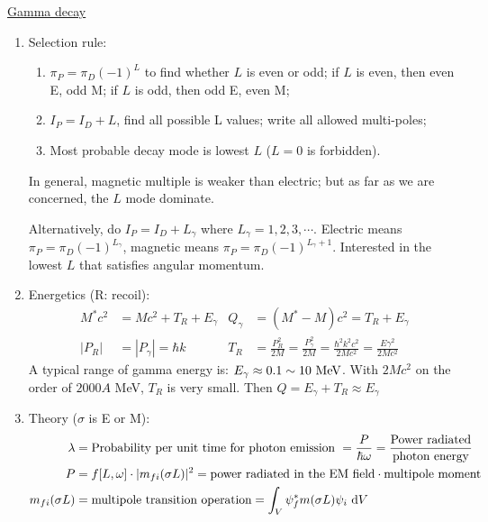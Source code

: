 \documentclass{school-22.101-notes}
\begin{document}
\clearpage
\uline{Gamma decay}
\begin{enumerate}
\item Selection rule:
    \begin{enumerate}
    \item  $\pi_P = \pi_D (-1)^L$ to find whether $L$ is even or odd; if $L$ is even, then even E, odd M; if $L$ is odd, then odd E, even M;
    \item $I_P = I_D + L$, find all possible L values; write all allowed multi-poles;
    \item Most probable decay mode is lowest $L$ ($L=0$ is forbidden). 
    \end{enumerate}
    In general, magnetic multiple is weaker than electric; but as far as we are concerned, the $L$ mode dominate. 

Alternatively, do $I_P = I_D + L_{\gamma}$ where $L_{\gamma} = 1,2,3, \cdots$.  Electric means $\pi_P = \pi_D (-1)^{L_{\gamma}}$, magnetic means $\pi_P = \pi_D (-1)^{L_{\gamma} + 1}$. Interested in the lowest $L$ that satisfies angular momentum. 

\item Energetics (R: recoil):
\begin{align}
M^* c^2 &= Mc^2 + T_R + E_{\gamma}  & Q_{\gamma} &=  (M^* - M)c^2  = T_R + E_{\gamma} \\
|P_R| &= |P_{\gamma}| = \hbar k & T_R &= \frac{P_R^2}{2M} = \frac{P_{\gamma}^2}{2M} = \frac{\hbar^2 k^2 c^2}{2Mc^2} = \frac{E \gamma^2}{2Mc^2} 
\end{align}
A typical range of gamma energy is: $E_{\gamma} \approx 0.1 \sim 10 \mbox{ } \mathrm{MeV}$. With $2Mc^2$ on the order of $2000 A$ MeV, $T_R$ is very small. Then $Q = E_{\gamma} + T_R \approx E_{\gamma}$
\item Theory ($\sigma$ is E or M): 
\begin{align}
\lambda &= \mbox{Probability per unit time for photon emission } = \frac{P}{\hbar \omega} = \frac{\mbox{Power radiated}}{\mbox{photon energy}} \\
P&= f[L,\omega] \cdot |m_{fi} (\sigma L)|^2 = \mbox{power radiated in the EM field} \cdot \mbox{multipole moment} \\
m_{fi} (\sigma L) &= \mbox{multipole transition operation} = \int_V \psi_f^* m(\sigma L) \psi_i \mbox{ }\mathrm{d} V 
\end{align}
\end{enumerate}
\end{document}
